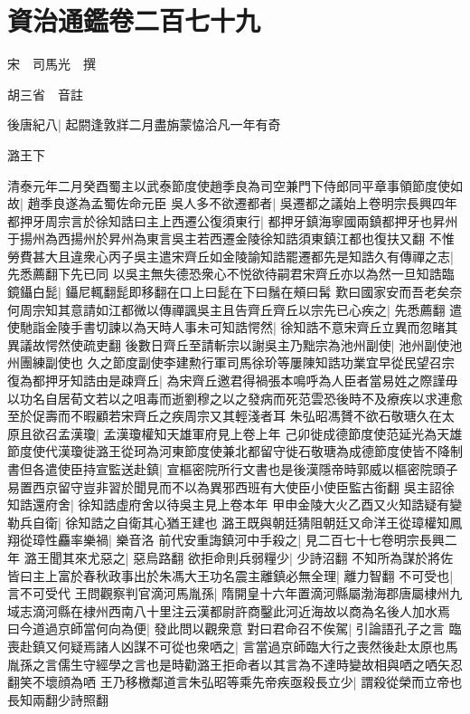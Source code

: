 \section{資治通鑑卷二百七十九}
宋　司馬光　撰

胡三省　音註

後唐紀八|{
	起閼逢敦牂二月盡旃蒙恊洽凡一年有奇}


潞王下

清泰元年二月癸酉蜀主以武泰節度使趙季良為司空兼門下侍郎同平章事領節度使如故|{
	趙季良遂為孟蜀佐命元臣}
吳人多不欲遷都者|{
	吳遷都之議始上卷明宗長興四年}
都押牙周宗言於徐知誥曰主上西遷公復須東行|{
	都押牙鎮海寧國兩鎮都押牙也昇州于揚州為西揚州於昇州為東言吳主若西遷金陵徐知誥須東鎮江都也復扶又翻}
不惟勞費甚大且違衆心丙子吳主遣宋齊丘如金陵諭知誥罷遷都先是知誥久有傳禪之志|{
	先悉薦翻下先已同}
以吳主無失德恐衆心不悦欲待嗣君宋齊丘亦以為然一旦知誥臨鏡鑷白髭|{
	鑷尼輒翻髭即移翻在口上曰髭在下曰鬚在頰曰髯}
歎曰國家安而吾老矣奈何周宗知其意請如江都微以傳禪諷吳主且告齊丘齊丘以宗先已心疾之|{
	先悉薦翻}
遣使馳詣金陵手書切諫以為天時人事未可知誥愕然|{
	徐知誥不意宋齊丘立異而忽睹其異議故愕然使疏吏翻}
後數日齊丘至請斬宗以謝吳主乃黜宗為池州副使|{
	池州副使池州團練副使也}
久之節度副使李建勲行軍司馬徐玠等屢陳知誥功業宜早從民望召宗復為都押牙知誥由是疎齊丘|{
	為宋齊丘邀君得禍張本鳴呼為人臣者當易姓之際謹毋以功名自居荀文若以之咀毒而逝劉穆之以之發病而死范雲恐後時不及療疾以求連愈至於促壽而不暇顧若宋齊丘之疾周宗又其輕淺者耳}
朱弘昭馮贇不欲石敬瑭久在太原且欲召孟漢瓊|{
	孟漢瓊權知天雄軍府見上卷上年}
己卯徙成德節度使范延光為天雄節度使代漢瓊徙潞王從珂為河東節度使兼北都留守徙石敬瑭為成德節度使皆不降制書但各遣使臣持宣監送赴鎮|{
	宣樞密院所行文書也是後漢隱帝時郭威以樞密院頭子易置西京留守豈非習於聞見而不以為異邪西班有大使臣小使臣監古銜翻}
吳主詔徐知誥還府舍|{
	徐知誥虛府舍以待吳主見上卷本年}
甲申金陵大火乙酉又火知誥疑有變勒兵自衛|{
	徐知誥之自衛其心猶王建也}
潞王既與朝廷猜阻朝廷又命洋王從璋權知鳳翔從璋性麤率樂禍|{
	樂音洛}
前代安重誨鎮河中手殺之|{
	見二百七十七卷明宗長興二年}
潞王聞其來尤惡之|{
	惡烏路翻}
欲拒命則兵弱糧少|{
	少詩沼翻}
不知所為謀於將佐皆曰主上富於春秋政事出於朱馮大王功名震主離鎮必無全理|{
	離力智翻}
不可受也|{
	言不可受代}
王問觀察判官滴河馬胤孫|{
	隋開皇十六年置滴河縣屬渤海郡唐屬棣州九域志滴河縣在棣州西南八十里注云漢都尉許商鑿此河近海故以商為名後人加水焉}
曰今道過京師當何向為便|{
	發此問以觀衆意}
對曰君命召不俟駕|{
	引論語孔子之言}
臨喪赴鎮又何疑焉諸人凶謀不可從也衆哂之|{
	言當過京師臨大行之喪然後赴太原也馬胤孫之言儒生守經學之言也是時勸潞王拒命者以其言為不達時變故相與哂之哂矢忍翻笑不壞顔為哂}
王乃移檄鄰道言朱弘昭等乘先帝疾亟殺長立少|{
	謂殺從榮而立帝也長知兩翻少詩照翻}
